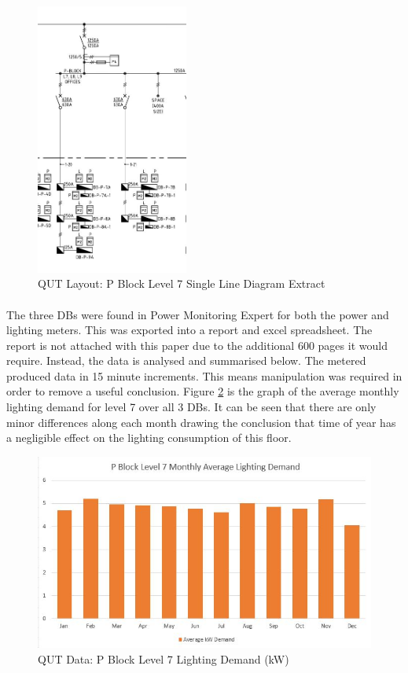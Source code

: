 \begin{figure}[H]
	\hfill\includegraphics[width = 50mm]{images/project-model/qut-lvl7-sld-extract}\hspace*{\fill}
	\caption{QUT Layout: P Block Level 7 Single Line Diagram Extract} 
	\label{fig:project-model-pblock-lvl7-sld-extract}
\end{figure}

\paragraph{}
The three DBs were found in Power Monitoring Expert for both the power and lighting meters. This was exported into a report and excel spreadsheet. The report is not attached with this paper due to the additional 600 pages it would require. Instead, the data is analysed and summarised below. The metered produced data in 15 minute increments. This means manipulation was required in order to remove a useful conclusion. Figure \ref{fig:pblock-lvl7-monthly-kw} is the graph of the average monthly lighting demand for level 7 over all 3 DBs. It can be seen that there are only minor differences along each month drawing the conclusion that time of year has a negligible effect on the lighting consumption of this floor.  

\begin{figure}[H]
	\hfill\includegraphics[width = 150mm]{images/metering/pme/pblock-lvl7-monthly-kw}\hspace*{\fill}
	\caption{QUT Data: P Block Level 7 Lighting Demand (kW)} 
	\label{fig:pblock-lvl7-monthly-kw}
\end{figure}  

